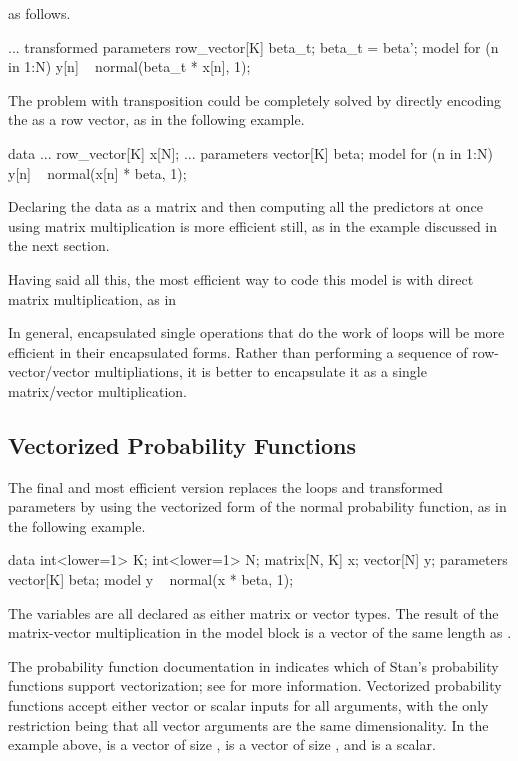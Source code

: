 as follows.
%
\begin{stancode}
...
transformed parameters {
  row_vector[K] beta_t;
  beta_t = beta';
}
model {
  for (n in 1:N)
    y[n] ~ normal(beta_t * x[n], 1);
}
\end{stancode}
%
The problem with transposition could be completely solved by directly
encoding the  as a row vector, as in the
following example.
%
\begin{stancode}
data {
  ...
  row_vector[K] x[N];
  ...
}
parameters {
  vector[K] beta;
}
model {
  for (n in 1:N)
    y[n] ~ normal(x[n] * beta, 1);
}
\end{stancode}
%
Declaring the data as a matrix and then computing all the predictors
at once using matrix multiplication is more efficient still, as in the
example discussed in the next section.

Having said all this, the most efficient way to code this model is
with direct matrix multiplication, as in
%
\begin{stancode}
data {
  matrix[N, K] x;
  vector[N] y;
}
parameters {
  vector[K] beta;
}
model {
  y ~ normal(x * beta, 1);
\end{stancode}
%
In general, encapsulated single operations that do the work of loops
will be more efficient in their encapsulated forms.  Rather than
performing a sequence of row-vector/vector multipliations, it is
better to encapsulate it as a single matrix/vector multiplication.

\subsection{Vectorized Probability Functions}

The final and most efficient version replaces the loops and
transformed parameters by using the vectorized form of the normal
probability function, as in the following example.
%
\begin{stancode}
data {
  int<lower=1> K;
  int<lower=1> N;
  matrix[N, K] x;
  vector[N] y;
}
parameters {
  vector[K] beta;
}
model {
  y ~ normal(x * beta, 1);
}
\end{stancode}
%
The variables are all declared as either matrix or vector types.
The result of the matrix-vector multiplication  in the
model block is a vector of the same length as .

The probability function documentation in 
indicates which of Stan's probability functions support
vectorization; see  for more
information.  Vectorized probability functions accept either vector or
scalar inputs for all arguments, with the only restriction being that
all vector arguments are the same dimensionality.  In the example
above,  is a vector of size ,  is a
vector of size , and  is a scalar.


